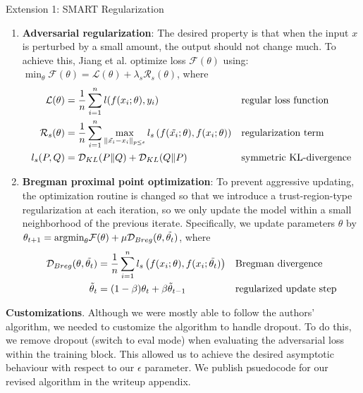 \documentclass[final]{beamer}
\newlength{\colwidth}
\begin{document}
\begin{frame}[t]
\begin{columns}[t]
\begin{column}{\colwidth}
\begin{block}{Extension 1: SMART Regularization}
\begin{enumerate}
    \item \textbf{Adversarial regularization}: The desired property is that when the input $x$ is perturbed by a small amount, the output should not change much. To achieve this, Jiang et al. \cite{smart} optimize loss $\mathcal{F}(\theta)$ using: $\min_{\theta} \mathcal{F}(\theta) = \mathcal{L}(\theta) + \lambda_{s}\mathcal{R}_{s}(\theta)$, where
    \begin{align*}
    \mathcal{L}(\theta) & = \frac{1}{n} \sum_{i=1}^{n} l(f(x_{i};\theta), y_{i}) && \text{regular loss function} \\
    \mathcal{R}_{s}(\theta) & = \frac{1}{n} \sum_{i=1}^{n} \max_{\lVert \Tilde{x_{i}} - x_{i} \rVert_{p \leq \epsilon}} l_{s}\left(f(\Tilde{x_{i}}; \theta), f(x_{i}; \theta)\right) && \text{regularization term}\\
    l_{s}(P, Q) & = \mathcal{D}_{KL}(P \lVert Q) + \mathcal{D}_{KL}(Q \lVert P) && \text{symmetric KL-divergence}
    \end{align*} \newline

    \item \textbf{Bregman proximal point optimization}: To prevent aggressive updating, the optimization routine is changed so that we introduce a trust-region-type regularization at each iteration, so we only update the model within a small neighborhood of the previous iterate. Specifically, we update parameters $\theta$ by $\theta_{t+1} = \text{argmin}_{\theta} \mathcal{F}(\theta) + \mu \mathcal{D}_{Breg}(\theta, \Tilde{\theta_{t}})$, where
    \begin{align*}
    \mathcal{D}_{Breg}(\theta, \Tilde{\theta_{t}}) & = \frac{1}{n} \sum_{i=1}^{n} l_{s} \left( f(x_{i}; \theta), f(x_{i}; \Tilde{\theta_{t}}) \right) && \text{Bregman divergence} \\
    \Tilde{\theta}_{t} & = (1 - \beta)\theta_{t} + \beta \Tilde{\theta}_{t-1} && \text{regularized update step}
    \end{align*}
\end{enumerate}

\textbf{Customizations}. Although we were mostly able to follow the authors' algorithm, we needed to customize the algorithm to handle dropout. To do this, we remove dropout (switch to eval mode) when evaluating the adversarial loss within the training block. This allowed us to achieve the desired asymptotic behaviour with respect to our $\epsilon$ parameter. We publish psuedocode for our revised algorithm in the writeup appendix.


\end{block}
\end{column}
\end{columns}
\end{frame}
\end{document}
